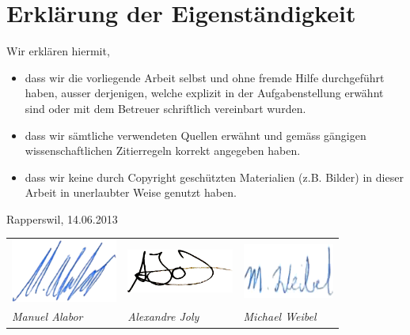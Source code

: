 \chapter*{Erklärung der Eigenständigkeit}

Wir erklären hiermit,

\begin{itemize}
	\item dass wir die vorliegende Arbeit selbst und ohne fremde Hilfe durchgeführt haben, ausser derjenigen, welche explizit in der Aufgabenstellung erwähnt sind oder mit dem Betreuer schriftlich vereinbart wurden.
	\item dass wir sämtliche verwendeten Quellen erwähnt und gemäss gängigen wissenschaftlichen Zitierregeln korrekt angegeben haben.
	\item dass wir keine durch Copyright geschützten Materialien (z.B. Bilder) in dieser Arbeit in unerlaubter Weise genutzt haben.
\end{itemize}

\vspace*{5mm}

Rapperswil, 14.06.2013

\vspace*{3cm}

\begin{table}[H]
\begin{tabularx}{\textwidth}{X X X}
	\includegraphics[width=3.5cm]{content/images/signature-mal.png} &
	\centering\includegraphics[width=3.5cm]{content/images/signature-ajo.png} &
	\hfill\includegraphics[width=3cm]{content/images/signature-mwe.png}

	\tabularnewline

	\sffamily\textit{Manuel Alabor} &
	\centering\sffamily\textit{Alexandre Joly} &
	\hfill\sffamily\textit{Michael Weibel}
	\tabularnewline
\end{tabularx}
\end{table}